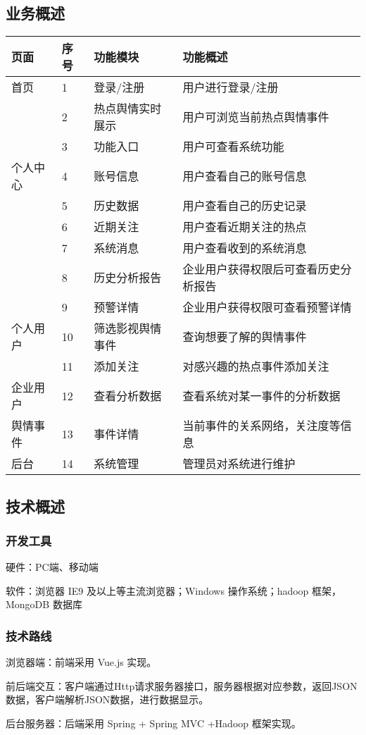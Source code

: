 \subsection{业务概述}
\begin{table}
    \centering
    \begin{tabular}{|l|l|l|l|}
    \hline
        页面 & 序号 & 功能模块 & 功能概述 \\ \hline
        首页 & 1 & 登录/注册 & 用户进行登录/注册 \\ \hline
         & 2 & 热点舆情实时展示 & 用户可浏览当前热点舆情事件 \\ \hline
         & 3 & 功能入口 & 用户可查看系统功能 \\ \hline
        个人中心 & 4 & 账号信息 & 用户查看自己的账号信息 \\ \hline
         & 5 & 历史数据 & 用户查看自己的历史记录 \\ \hline
         & 6 & 近期关注 & 用户查看近期关注的热点 \\ \hline
         & 7 & 系统消息 & 用户查看收到的系统消息 \\ \hline
         & 8 & 历史分析报告 & 企业用户获得权限后可查看历史分析报告 \\ \hline
         & 9 & 预警详情 & 企业用户获得权限可查看预警详情 \\ \hline
        个人用户 & 10 & 筛选影视舆情事件 & 查询想要了解的舆情事件 \\ \hline
         & 11 & 添加关注 & 对感兴趣的热点事件添加关注 \\ \hline
        企业用户 & 12 & 查看分析数据 & 查看系统对某一事件的分析数据 \\ \hline
        舆情事件 & 13 & 事件详情 & 当前事件的关系网络，关注度等信息 \\ \hline
        后台 & 14 & 系统管理 & 管理员对系统进行维护 \\ \hline
    \end{tabular}
\end{table}

\subsection{技术概述}
\subsubsection{开发工具}
硬件：PC端、移动端

软件：浏览器 IE9 及以上等主流浏览器；Windows 操作系统；hadoop 框架，MongoDB 数据库
\subsubsection{技术路线}
浏览器端：前端采用 Vue.js 实现。

前后端交互：客户端通过Http请求服务器接口，服务器根据对应参数，返回JSON数据，客户端解析JSON数据，进行数据显示。

后台服务器：后端采用 Spring + Spring MVC +Hadoop 框架实现。